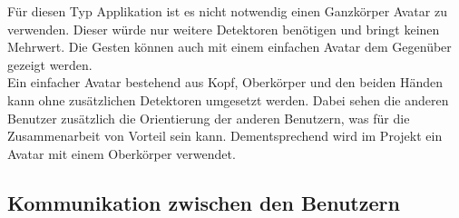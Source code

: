 \bigskip
Für diesen Typ Applikation ist es nicht notwendig einen Ganzkörper Avatar zu verwenden. Dieser würde nur weitere Detektoren benötigen und bringt keinen Mehrwert. Die Gesten können auch mit einem einfachen Avatar dem Gegenüber gezeigt werden. \\
\noindent Ein einfacher Avatar bestehend aus Kopf, Oberkörper und den beiden Händen kann ohne zusätzlichen Detektoren umgesetzt werden. Dabei sehen die anderen Benutzer zusätzlich die Orientierung der anderen Benutzern, was für die Zusammenarbeit von Vorteil sein kann. Dementsprechend wird im Projekt ein Avatar mit einem Oberkörper verwendet.

\subsection{Kommunikation zwischen den Benutzern}
\label{ch:kommunikation_zwischen_benutzern}


